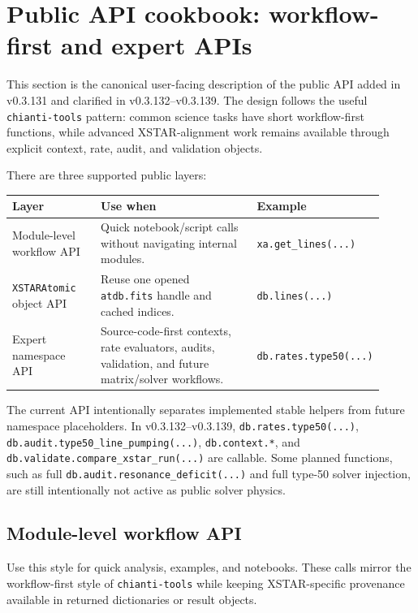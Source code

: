 \documentclass[11pt]{article}
\begin{document}
\section{Public API cookbook: workflow-first and expert APIs}

This section is the canonical user-facing description of the public API added in v0.3.131 and clarified in v0.3.132--v0.3.139. The design follows the useful \texttt{chianti-tools} pattern: common science tasks have short workflow-first functions, while advanced XSTAR-alignment work remains available through explicit context, rate, audit, and validation objects.

There are three supported public layers:

\begin{longtable}{p{0.24\linewidth}p{0.43\linewidth}p{0.24\linewidth}}
\toprule
Layer & Use when & Example \\
\midrule
Module-level workflow API & Quick notebook/script calls without navigating internal modules. & \texttt{xa.get\_lines(...)} \\
\texttt{XSTARAtomic} object API & Reuse one opened \texttt{atdb.fits} handle and cached indices. & \texttt{db.lines(...)} \\
Expert namespace API & Source-code-first contexts, rate evaluators, audits, validation, and future matrix/solver workflows. & \texttt{db.rates.type50(...)} \\
\bottomrule
\end{longtable}

The current API intentionally separates implemented stable helpers from future namespace placeholders. In v0.3.132--v0.3.139, \texttt{db.rates.type50(...)}, \texttt{db.audit.type50\_line\_pumping(...)}, \texttt{db.context.*}, and \texttt{db.validate.compare\_xstar\_run(...)} are callable. Some planned functions, such as full \texttt{db.audit.resonance\_deficit(...)} and full type-50 solver injection, are still intentionally not active as public solver physics.

\subsection{Module-level workflow API}

Use this style for quick analysis, examples, and notebooks. These calls mirror the workflow-first style of \texttt{chianti-tools} while keeping XSTAR-specific provenance available in returned dictionaries or result objects.
\end{document}
